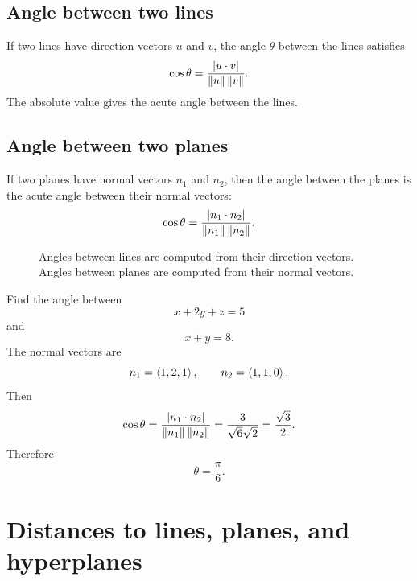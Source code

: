 \subsection{Angle between two lines}

If two lines have direction vectors $u$ and $v$, the angle $\theta$ between the lines satisfies
\[
  \cos\theta=\frac{\left\lvert u\cdot v\right\rvert}{\left\lVert u\right\rVert\left\lVert v\right\rVert}.
\]
The absolute value gives the acute angle between the lines.

\subsection{Angle between two planes}

If two planes have normal vectors $n_1$ and $n_2$, then the angle between the planes is the acute angle between their normal vectors:
\[
  \cos\theta=\frac{\left\lvert n_1\cdot n_2\right\rvert}{\left\lVert n_1\right\rVert\left\lVert n_2\right\rVert}.
\]

\begin{figure}[H]
\centering
{}
\caption{Angles between lines are computed from their direction vectors. Angles between planes are computed from their normal vectors.}
\end{figure}

\begin{examplebox}[title={Example 4.9: Angle between two planes}]
Find the angle between
\[
  x+2y+z=5
\]
and
\[
  x+y=8.
\]
The normal vectors are
\[
  n_1=\left\langle 1,2,1\right\rangle,\qquad n_2=\left\langle 1,1,0\right\rangle.
\]
Then
\[
  \cos\theta=\frac{\left\lvert n_1\cdot n_2\right\rvert}{\left\lVert n_1\right\rVert\left\lVert n_2\right\rVert}
  =\frac{3}{\sqrt 6\sqrt 2}
  =\frac{\sqrt 3}{2}.
\]
Therefore
\[
  \theta=\frac{\pi}{6}.
\]
\end{examplebox}

\section{Distances to lines, planes, and hyperplanes}

